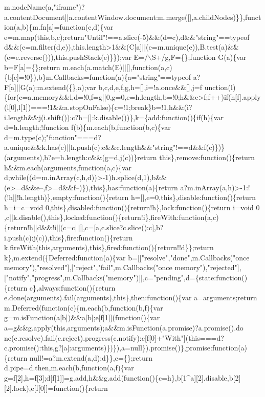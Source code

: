 \begin{DoxyCode}
{       m.nodeName(a,"iframe")?a.contentDocument||a.contentWindow.document:m.merge([],a.childNodes)\}\},function(a,b)\{m.fn[a]=function(c,d)\{var
       e=m.map(this,b,c);return"Until"!==a.slice(-5)&&(d=c),d&&"string"==typeof
       d&&(e=m.filter(d,e)),this.length>1&&(C[a]||(e=m.unique(e)),B.test(a)&&(e=e.reverse())),this.pushStack(e)\}\});var E=/\(\backslash\)S+/g,F=\{\};function G(a)\{var b=F[a]=\{\};return
       m.each(a.match(E)||[],function(a,c)\{b[c]=!0\}),b\}m.Callbacks=function(a)\{a="string"==typeof a?F[a]||G(a):m.extend(\{\},a);var
       b,c,d,e,f,g,h=[],i=!a.once&&[],j=f
      unction(l)\{for(c=a.memory&&l,d=!0,f=g||0,g=0,e=h.length,b=!0;h&&e>f;f++)if(h[f].apply(l[0],l[1])===!1&&a.stopOnFalse)\{c=!1;break\}b=!1,h&&(i?i.length&&j(i.shift()):c?h=[]:k.disable())\},k=\{add:function()\{if(h)\{var
       d=h.length;!function f(b)\{m.each(b,function(b,c)\{var
       d=m.type(c);"function"===d?a.unique&&k.has(c)||h.push(c):c&&c.length&&"string"!==d&&f(c)\})\}(arguments),b?e=h.length:c&&(g=d,j(c))\}return
       this\},remove:function()\{return h&&m.each(arguments,function(a,c)\{var
       d;while((d=m.inArray(c,h,d))>-1)h.splice(d,1),b&&(e>=d&&e--,f>=d&&f--)\}),this\},has:function(a)\{return a?m.inArray(a,h)>-1:!(!h||!h.length)\},empty:function()\{return
       h=[],e=0,this\},disable:function()\{return h=i=c=void 0,this\},disabled:function()\{return!h\},lock:function()\{return i=void
       0
      ,c||k.disable(),this\},locked:function()\{return!i\},fireWith:function(a,c)\{return!h||d&&!i||(c=c||[],c=[a,c.slice?c.slice():c],b?i.push(c):j(c)),this\},fire:function()\{return
       k.fireWith(this,arguments),this\},fired:function()\{return!!d\}\};return k\},m.extend(\{Deferred:function(a)\{var b=[["resolve","done",m.Callbacks("once
       memory"),"resolved"],["reject","fail",m.Callbacks("once
       memory"),"rejected"],["notify","progress",m.Callbacks("memory")]],c="pending",d=\{state:function()\{return c\},always:function()\{return
       e.done(arguments).fail(arguments),this\},then:function()\{var a=arguments;return m.Deferred(function(c)\{m.each(b,function(b,f)\{var
       g=m.isFunction(a[b])&&a[b];e[f[1]](function()\{var
       a=g&&g.apply(this,arguments);a&&m.isFunction(a.promise)?a.promise().do
      ne(c.resolve).fail(c.reject).progress(c.notify):c[f[0]+"With"](this===d?c.promise():this,g?[a]:arguments)\})\}),a=null\}).promise()\},promise:function(a)\{return null!=a?m.extend(a,d):d\}\},e=\{\};return
       d.pipe=d.then,m.each(b,function(a,f)\{var
       g=f[2],h=f[3];d[f[1]]=g.add,h&&g.add(function()\{c=h\},b[1^a][2].disable,b[2][2].lock),e[f[0]]=function()\{return
}
\end{DoxyCode}
